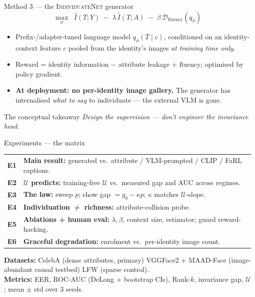 \documentclass[aspectratio=169,10pt]{beamer}
\newcommand{\U}{\mathcal{U}}
\newcommand{\method}{\textsc{IndividuateNet}}
\begin{document}
\begin{frame}{Method 3 --- the \method{} generator}
  \[
    \max_{\phi}\;\; \hat I(T;Y)\;-\;\lambda\,\hat I(T;A)\;-\;\beta\,\mathcal{D}_{\text{fluency}}(q_\phi)
  \]
  \begin{itemize}
    \item Prefix-/adapter-tuned language model $q_\phi(T\mid c)$, conditioned on an
      identity-context feature $c$ pooled from the identity's images \emph{at training time only}.
    \item Reward = identity information $-$ attribute leakage $+$ fluency; optimised by policy gradient.
    \item \textbf{At deployment: no per-identity image gallery.} The generator has internalised
      \emph{what to say} to individuate --- the external VLM is gone.
  \end{itemize}
  \vspace{0.3em}
  \begin{block}{The conceptual takeaway}
    \emph{Design the supervision --- don't engineer the invariance head.}
  \end{block}
\end{frame}

\begin{frame}{Experiments --- the matrix}
  \small
  \begin{tabular}{@{}p{}p{}@{}}
    \toprule
    \textbf{E1} & \textbf{Main result:} generated vs.\ attribute / VLM-prompted / CLIP / FaRL captions. \\
    \textbf{E2} & \textbf{$\U$ predicts:} training-free $\U$ vs.\ measured gap and AUC across regimes. \\
    \textbf{E3} & \textbf{The law:} sweep $p$; show gap $=g_0-\kappa p$; $\kappa$ matches $\U$-slope. \\
    \textbf{E4} & \textbf{Individuation $\neq$ richness:} attribute-collision probe. \\
    \textbf{E5} & \textbf{Ablations + human eval:} $\lambda,\beta$, context size, estimator; guard reward-hacking. \\
    \textbf{E6} & \textbf{Graceful degradation:} enrolment vs.\ per-identity image count. \\
    \bottomrule
  \end{tabular}
  \vspace{0.6em}

  \footnotesize
  \textbf{Datasets:} CelebA (dense attributes, primary) \textbullet{} VGGFace2 + MAAD-Face
  (image-abundant causal testbed) \textbullet{} LFW (sparse control). \\
  \textbf{Metrics:} EER, ROC-AUC (DeLong + bootstrap CIs), Rank-$k$, invariance gap, $\U$;
  mean $\pm$ std over 3 seeds.
\end{frame}
\end{document}
